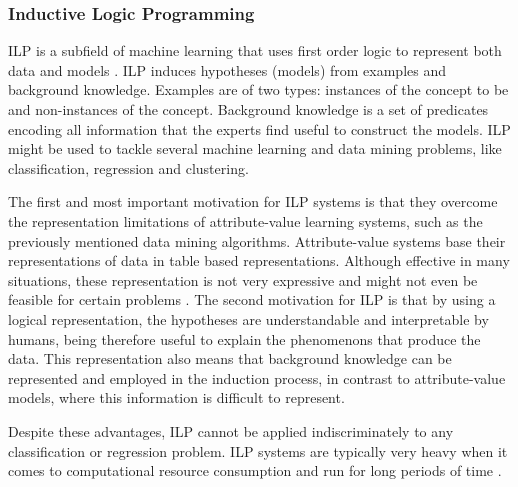 \subsubsection*{Inductive Logic Programming}

ILP is a subfield of machine learning that uses first order logic to represent
both data and models \cite{Lavrac1998}. ILP induces hypotheses (models) from
examples and background knowledge. Examples are of two types: instances of the
concept to be  and non-instances of the concept. Background
knowledge is a set of predicates encoding all information that the experts find
useful to construct the models. ILP might be used to tackle several machine
learning and data mining problems, like classification, regression and
clustering.

The first and most important motivation for ILP systems is that they overcome
the representation limitations of attribute-value learning systems, such as the
previously mentioned data mining algorithms. Attribute-value systems base their
representations of data in table based representations. Although effective in
many situations, these representation is not very expressive and might not even
be feasible for certain problems \cite{Bratko:1995:AIL:219717.219771}. The
second motivation for ILP is that by using a logical representation, the
hypotheses are understandable and interpretable by humans, being therefore
useful to explain the phenomenons that produce the data. This representation
also means that background knowledge can be represented and employed in the
induction process, in contrast to attribute-value models, where this information
is difficult to represent.

Despite these advantages, ILP cannot be applied indiscriminately to any
classification or regression problem. ILP systems are typically very heavy when
it comes to computational resource consumption and run for long periods of time
\cite{fonseca2003implementation}.



